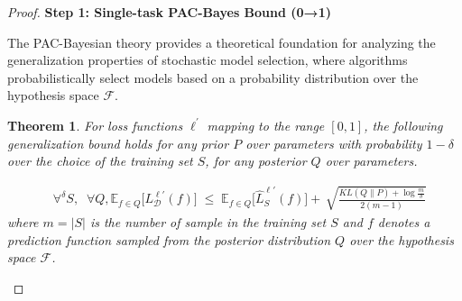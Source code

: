 \documentclass[letterpaper]{article} %
\newtheorem{theorem}{Theorem}
\begin{document}
\begin{proof}
\textbf{Step 1: Single-task PAC-Bayes Bound (0→1)}

The PAC-Bayesian theory provides a theoretical foundation for analyzing the generalization properties of stochastic model selection, where algorithms probabilistically select models based on a probability distribution over the hypothesis space \(\mathcal{F}\). 


\begin{theorem} \label{the: PAC1999}
\citep{mcallesterPACBayesianStochasticModel2003}
For loss functions $\ell^{'}$ mapping to the range $[0,1]$, the following generalization bound holds for any prior $P$ over parameters with probability $1 - \delta$ over the choice of the training set $S$, for any posterior $Q$ over parameters.

\begin{equation}\label{eq:PAC2003}
\begin{aligned}
    &\forall^{\delta} S,\;\; \forall Q, 
    \mathbb{E}_{f \in Q}\big[L_{\mathcal{D}}^{\ell'}(f)\big] \;\leq\;
    \mathbb{E}_{f \in Q}\big[\hat{L}^{\ell'}_{S}(f)\big] 
    +\, \sqrt{
        \frac{
            KL(Q\|P) + \log\frac{m}{\delta}
        }{
            2(m-1)
        }
    }
\end{aligned}
\end{equation}
where $m=|S|$ is the number of sample in the training set $S$ and $f$ denotes a prediction function sampled from the posterior distribution $Q$ over the hypothesis space $\mathcal{F}$.
\end{theorem}


\end{proof}
\end{document}
